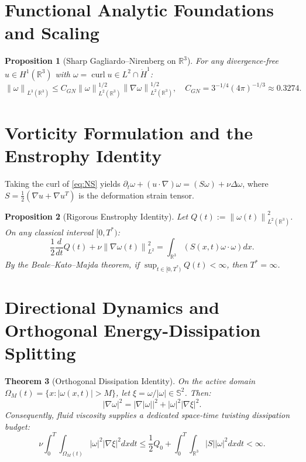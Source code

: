 \documentclass[11pt,reqno]{amsart}
\numberwithin{equation}{section}
\newtheorem{theorem}{Theorem}[section]
\newtheorem{proposition}[theorem]{Proposition}
\theoremstyle{definition}
\newcommand{\R}{\mathbb{R}}
\newcommand{\Sspec}{\mathbb{S}}
\newcommand{\norm}[1]{\left\lVert#1\right\rVert}
\begin{document}
\section{Functional Analytic Foundations and Scaling}

\begin{proposition}[Sharp Gagliardo--Nirenberg on $\R^3$]\label{prop:GN}
For any divergence-free $u \in H^1(\R^3)$ with $\omega = \operatorname{curl} u \in L^2 \cap \dot{H}^1$:
\begin{equation}\label{eq:GN3}
\norm{\omega}_{L^3(\R^3)} \le C_{GN} \norm{\omega}_{L^2(\R^3)}^{1/2} \norm{\nabla \omega}_{L^2(\R^3)}^{1/2}, \quad C_{GN} = 3^{-1/4} (4\pi)^{-1/3} \approx 0.3274.
\end{equation}
\end{proposition}

\section{Vorticity Formulation and the Enstrophy Identity}

Taking the curl of \eqref{eq:NS} yields $\partial_t \omega + (u \cdot \nabla)\omega = (S\omega) + \nu \Delta \omega$, where $S = \frac{1}{2}(\nabla u + \nabla u^T)$ is the deformation strain tensor.

\begin{proposition}[Rigorous Enstrophy Identity]\label{prop:enstrophy}
Let $Q(t) := \norm{\omega(t)}_{L^2(\R^3)}^2$. On any classical interval $[0, T^*)$:
\begin{equation}\label{eq:enstrophy_id}
\frac{1}{2} \frac{d}{dt} Q(t) + \nu \norm{\nabla \omega(t)}_{L^2}^2 = \int_{\R^3} (S(x,t)\omega \cdot \omega) dx.
\end{equation}
By the Beale--Kato--Majda theorem, if $\sup_{t \in [0, T^*)} Q(t) < \infty$, then $T^* = \infty$.
\end{proposition}

\section{Directional Dynamics and Orthogonal Energy-Dissipation Splitting}

\begin{theorem}[Orthogonal Dissipation Identity]\label{thm:orthogonal}
On the active domain $\Omega_M(t) = \{x : |\omega(x,t)| > M\}$, let $\xi = \omega / |\omega| \in \Sspec^2$. Then:
\begin{equation}\label{eq:orthogonal_split}
|\nabla \omega|^2 = |\nabla |\omega||^2 + |\omega|^2 |\nabla \xi|^2.
\end{equation}
Consequently, fluid viscosity supplies a dedicated space-time twisting dissipation budget:
\begin{equation}\label{eq:twisting_budget}
\nu \int_0^T \int_{\Omega_M(t)} |\omega|^2 |\nabla \xi|^2 dx dt \le \frac{1}{2} Q_0 + \int_0^T \int_{\R^3} |S| |\omega|^2 dx dt < \infty.
\end{equation}
\end{theorem}
\end{document}
